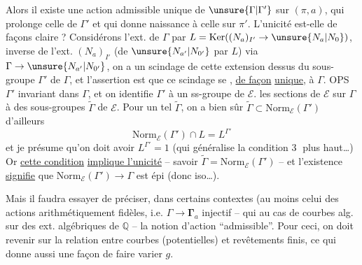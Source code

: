 
Alors il existe une action admissible unique de $\unsure{\Gamma|\Gamma'}$
sur $(\pi,a)$, qui prolonge celle de $\Gamma'$ et qui donne naissance
à celle  sur $\pi'$.
 L'unicité est-elle de  façons claire ?
 Considérons l'ext.  de
$\Gamma$ par $L=\mathrm{Ker}((N_a)_{I'}\to\unsure{N_a|N_0})$,
 inverse de l'ext. $(N_a)_{I'}$
(de $\unsure{N_{a'}|N_{0'}}$ par $L$) via $\Gamma\to\unsure{N_{a'}|N_{0'}}$, on
a un scindage  de cette extension  dessus
du sous-groupe $\Gamma'$ de $\Gamma$, et l'assertion est
que ce scindage se \uline{}, \uline{de façon} \uline{unique}, à $\Gamma$.
OPS $\Gamma'$ invariant dans $\Gamma$, et on
identifie $\Gamma'$ à un ss-groupe de $\mathcal{E}$. 
 les sections de $\mathcal{E}$ sur $\Gamma$ 
à des sous-groupes  $\widetilde{\Gamma}$ de $\mathcal{E}$.
Pour un tel $\widetilde{\Gamma}$, on a bien sûr
$\widetilde{\Gamma}\subset\mathrm{Norm}_{\mathcal{E}}(\Gamma')$
d'ailleurs  
\[
\mathrm{Norm}_{\mathcal{E}}(\Gamma')\cap L=L^{\Gamma'} \tag{31}
\]
et je présume qu'on doit avoir
$L^{\Gamma'}=1$ (qui généralise la condition
\textcircled{3} plus haut\ldots) Or \uline{cette condition}
\uline{implique l'unicité} -- savoir
$\widetilde{\Gamma}=\mathrm{Norm}_{\mathcal{E}}(\Gamma')$ --
et l'existence \uline{signifie} que
$\mathrm{Norm}_{\mathcal{E}}(\Gamma')\to\Gamma$
est épi (donc iso\ldots).

Mais il faudra essayer de préciser,
dans certains contextes (au moins celui des
actions arithmétiquement fidèles, i.e. $\Gamma\to\boldsymbol{\Gamma}_a$
injectif -- qui  
au cas de courbes alg.  sur des
ext. algébriques de $\mathbb{Q}$ -- la notion
d'action ``admissible''. Pour ceci, on
doit revenir sur la relation entre
courbes (potentielles) et revêtements finis,
ce qui donne aussi une façon de
faire varier $g$.


